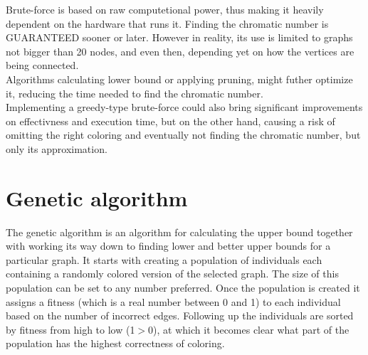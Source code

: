 \documentclass[a4paper]{report}
\begin{document}
		Brute-force is based on raw computetional power, thus making it heavily dependent on the hardware that runs it. Finding the chromatic number is GUARANTEED sooner or later. However in reality, its use is limited to graphs not bigger than 20 nodes, and even then, depending yet on how the vertices are being connected.\\
		
		Algorithms calculating lower bound or applying pruning, might futher optimize it, reducing the time needed to find the chromatic number. \\
		
		Implementing a greedy-type brute-force could also bring significant improvements on effectivness and execution time, but on the other hand, causing a risk of omitting the right coloring and eventually not finding the chromatic number, but only its approximation.	
			
		\section{Genetic algorithm}
		The genetic algorithm is an algorithm for calculating the upper bound together with working its way down to finding lower and better upper bounds for a particular graph. It starts with creating a population of individuals each containing a randomly colored version of the selected graph. The size of this population can be set to any number preferred. Once the population is created it assigns a fitness (which is a real number between 0 and 1) to each individual based on the number of incorrect edges. Following up the individuals are sorted by fitness from high to low (1$>$0), at which it becomes clear what part of the population has the highest correctness of coloring.\\
		
\end{document}
